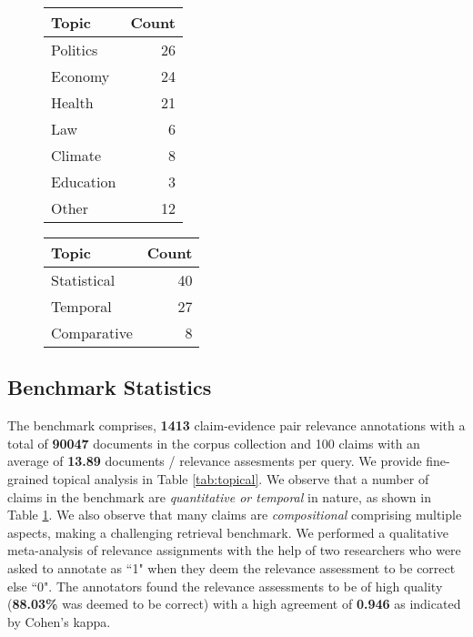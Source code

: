 \begin{figure}
\begin{minipage}{0.22\textwidth}
\label{tab:topical}
\begin{tabular}{lr}
\hline
\textbf{Topic} & \textbf{Count}  \\

\midrule
Politics & 26 \\
Economy & 24 \\
Health & 21 \\
Law & 6 \\
Climate & 8 \\
Education & 3 \\
Other &  12\\

\bottomrule
\end{tabular}\end{minipage}
\begin{minipage}{0.22\textwidth}
\label{tab:taxonomy}
\begin{tabular}{lr}
\hline
\textbf{Topic} & \textbf{Count}  \\

\midrule
Statistical & 40 \\
Temporal & 27 \\
Comparative & 8 \\

\bottomrule
\end{tabular}
\end{minipage}

\end{figure}


\vspace{-0.6em}

\subsection{Benchmark Statistics}
 The benchmark comprises, \textbf{1413} claim-evidence  pair relevance annotations with a total of \textbf{90047} documents in the corpus collection and 100 claims with an average of \textbf{13.89} documents / relevance assesments per query. We provide fine-grained topical analysis in Table \ref{tab:topical}. We observe that a number of claims in the benchmark are \textit{quantitative or temporal} in nature, as shown in Table \ref{tab:taxonomy}. We also observe that many claims are \textit{compositional} comprising multiple aspects, making \name{} a challenging retrieval benchmark. We performed a qualitative meta-analysis of relevance assignments with the help of two researchers who were asked to annotate as ``1" when they deem the relevance assessment to be correct else ``0". The annotators found the relevance assessments to be of high quality (\textbf{88.03\%} was deemed to be correct) with a high agreement of \textbf{0.946} as indicated by Cohen's kappa.